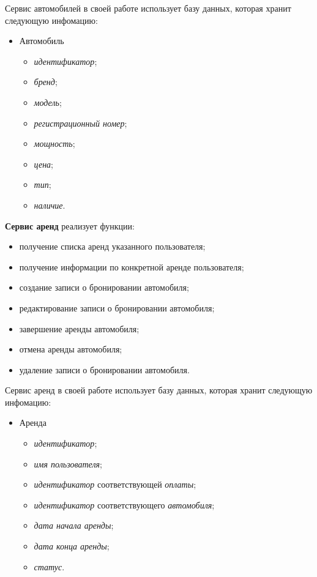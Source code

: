 Сервис автомобилей в своей работе использует базу данных, которая хранит следующую инфомацию:

\begin{itemize}
	\item Автомобиль
	\begin{itemize}
		\item \textit{идентификатор};
		\item \textit{бренд};
		\item \textit{модель};
		\item \textit{регистрационный номер};
		\item \textit{мощность};
		\item \textit{цена};
		\item \textit{тип};
		\item \textit{наличие}.
	\end{itemize}
\end{itemize}

\textbf{Сервис аренд} реализует функции:
\begin{itemize}
	\item получение списка аренд указанного пользователя;
	
	\item получение информации по конкретной аренде пользователя;
	
	\item создание записи о бронировании автомобиля;
	
	\item редактирование записи о бронировании автомобиля;
	
	\item завершение аренды автомобиля;
	
	\item отмена аренды автомобиля;
	
	\item удаление записи о бронировании автомобиля.
\end{itemize}

Сервис аренд в своей работе использует базу данных, которая хранит следующую инфомацию:

\begin{itemize}
	\item Аренда
	\begin{itemize}
		\item \textit{идентификатор};
		\item \textit{имя пользователя};
		\item \textit{идентификатор} соответствующей \textit{оплаты};
		\item \textit{идентификатор} соответствующего \textit{автомобиля};
		\item \textit{дата начала аренды};
		\item \textit{дата конца аренды};
		\item \textit{статус}.
	\end{itemize}
\end{itemize}

